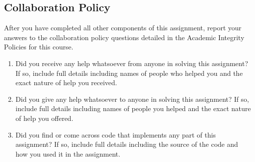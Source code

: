 \documentclass[11pt,addpoints,answers]{exam}
\numberwithin{equation}{section} %
\numberwithin{figure}{section} %
\numberwithin{table}{section} %
\begin{document}
\clearpage
\subsection{Collaboration Policy}

    After you have completed all other components of this assignment, report your answers to the collaboration policy questions detailed in the Academic Integrity Policies for this course.
    \begin{enumerate}
        \item Did you receive any help whatsoever from anyone in solving this assignment? If so, include full details including names of people who helped you and the exact nature of help you received.
        
        \begin{tcolorbox}[fit,height=4cm, width=15cm, blank, borderline={1pt}{-2pt},nobeforeafter]
       \end{tcolorbox}
        \item Did you give any help whatsoever to anyone in solving this assignment? If so, include full details including names of people you helped and the exact nature of help you offered.
        
        \begin{tcolorbox}[fit,height=4cm, width=15cm, blank, borderline={1pt}{-2pt},nobeforeafter]
       \end{tcolorbox}
        \item Did you find or come across code that implements any part of this assignment? If so, include full details including the source of the code and how you used it in the assignment.
        
        \begin{tcolorbox}[fit,height=4cm, width=15cm, blank, borderline={1pt}{-2pt},nobeforeafter]
       \end{tcolorbox}
    \end{enumerate}
\end{document}
